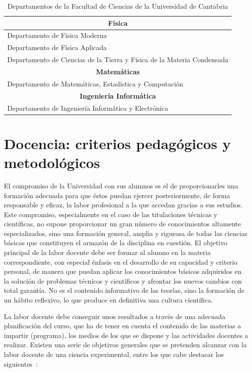 \begin{table}[!ht]
\centering
\begin{tabular}{|l|}
\hline\hline
\multicolumn{1}{|c|}{\textbf{Física}}\\
\hline\hline
Departamento de Física Moderna \\
Departamento de Física Aplicada \\
Departamento de Ciencias de la Tierra y Física de la Materia Condensada  \\
\hline\hline
\multicolumn{1}{|c|}{\textbf{Matemáticas}}\\
\hline\hline
Departamento de Matemáticas, Estadística y Computación\\
\hline\hline
\multicolumn{1}{|c|}{\textbf{Ingeniería Informática}}\\
\hline\hline
Departamento de Ingeniería Informática y Electrónica \\
\hline\hline
\end{tabular}
\caption{\label{tab:departamentos} Departamentos de la Facultad de Ciencias de la Universidad de Cantabria}
\end{table}

\section{Docencia: criterios pedagógicos y metodológicos}
\label{metodologicos}

El compromiso de la Universidad con sus alumnos es el de proporcionarles una formación adecuada para que éstos puedan ejercer posteriormente, de forma responsable y eficaz, la labor profesional a la que accedan gracias a sus estudios. Este compromiso, especialmente en el caso de las titulaciones técnicas y científicas, no supone proporcionar un gran número de conocimientos altamente especializados, sino una formación general, amplia y rigurosa de todas las ciencias básicas que constituyen el armazón de la disciplina en cuestión. El objetivo principal de la labor docente debe ser formar al alumno en la materia correspondiente, con especial énfasis en el desarrollo de su capacidad y criterio personal, de manera que puedan aplicar los conocimientos básicos adquiridos en la solución de problemas técnicos y científicos y afrontar los nuevos cambios con total garantía. No es el contenido informativo de las teorías, sino la formación de un hábito reflexivo, lo que produce en definitiva una cultura científica.

La labor docente debe conseguir unos resultados a través de una adecuada planificación del curso, que ha de tener en cuenta el contenido de las materias a impartir (programa), los medios de los que se dispone y las actividades docentes a realizar. Existen una serie de objetivos generales que se pretenden alcanzar con la labor docente de una ciencia experimental, entre los que cabe destacar los siguientes~\cite{zabalza}:


